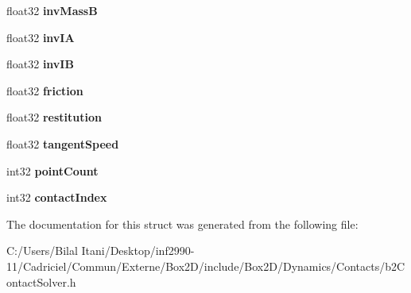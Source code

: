\begin{DoxyCompactItemize}
\item 
float32 {\bfseries inv\+MassB}\hypertarget{structb2_contact_velocity_constraint_ac75c816e94402ed4d93f232d211d4f62}{}\label{structb2_contact_velocity_constraint_ac75c816e94402ed4d93f232d211d4f62}

\item 
float32 {\bfseries inv\+IA}\hypertarget{structb2_contact_velocity_constraint_ac6c18706a9ee89c5a682dc610e86e00f}{}\label{structb2_contact_velocity_constraint_ac6c18706a9ee89c5a682dc610e86e00f}

\item 
float32 {\bfseries inv\+IB}\hypertarget{structb2_contact_velocity_constraint_aae02d4fd8f60353385b9cc876dc78a81}{}\label{structb2_contact_velocity_constraint_aae02d4fd8f60353385b9cc876dc78a81}

\item 
float32 {\bfseries friction}\hypertarget{structb2_contact_velocity_constraint_a11025786ae828eeeb60dfcd15358d934}{}\label{structb2_contact_velocity_constraint_a11025786ae828eeeb60dfcd15358d934}

\item 
float32 {\bfseries restitution}\hypertarget{structb2_contact_velocity_constraint_a6734f74c1970abc64ed7dcffd8737257}{}\label{structb2_contact_velocity_constraint_a6734f74c1970abc64ed7dcffd8737257}

\item 
float32 {\bfseries tangent\+Speed}\hypertarget{structb2_contact_velocity_constraint_aaf6acabb0ef62eeac647250e2520a272}{}\label{structb2_contact_velocity_constraint_aaf6acabb0ef62eeac647250e2520a272}

\item 
int32 {\bfseries point\+Count}\hypertarget{structb2_contact_velocity_constraint_a1decd7bf6a5dc61bd72d4e87b070a660}{}\label{structb2_contact_velocity_constraint_a1decd7bf6a5dc61bd72d4e87b070a660}

\item 
int32 {\bfseries contact\+Index}\hypertarget{structb2_contact_velocity_constraint_a4c76b9292f28859e2f8c9d075e79b873}{}\label{structb2_contact_velocity_constraint_a4c76b9292f28859e2f8c9d075e79b873}

\end{DoxyCompactItemize}


The documentation for this struct was generated from the following file\+:\begin{DoxyCompactItemize}
\item 
C\+:/\+Users/\+Bilal Itani/\+Desktop/inf2990-\/11/\+Cadriciel/\+Commun/\+Externe/\+Box2\+D/include/\+Box2\+D/\+Dynamics/\+Contacts/b2\+Contact\+Solver.\+h\end{DoxyCompactItemize}
